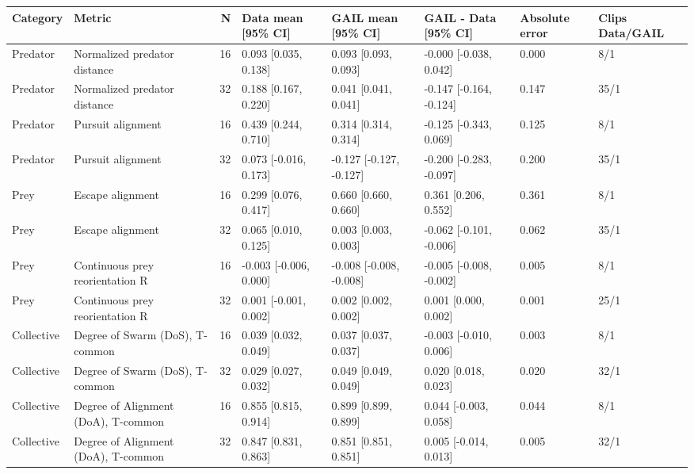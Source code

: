 \begin{tabular}{llrlllll}
\toprule
Category & Metric & N & Data mean [95\% CI] & GAIL mean [95\% CI] & GAIL - Data [95\% CI] & Absolute error & Clips Data/GAIL \\
\midrule
Predator & Normalized predator distance & 16 & 0.093 [0.035, 0.138] & 0.093 [0.093, 0.093] & -0.000 [-0.038, 0.042] & 0.000 & 8/1 \\
Predator & Normalized predator distance & 32 & 0.188 [0.167, 0.220] & 0.041 [0.041, 0.041] & -0.147 [-0.164, -0.124] & 0.147 & 35/1 \\
Predator & Pursuit alignment & 16 & 0.439 [0.244, 0.710] & 0.314 [0.314, 0.314] & -0.125 [-0.343, 0.069] & 0.125 & 8/1 \\
Predator & Pursuit alignment & 32 & 0.073 [-0.016, 0.173] & -0.127 [-0.127, -0.127] & -0.200 [-0.283, -0.097] & 0.200 & 35/1 \\
Prey & Escape alignment & 16 & 0.299 [0.076, 0.417] & 0.660 [0.660, 0.660] & 0.361 [0.206, 0.552] & 0.361 & 8/1 \\
Prey & Escape alignment & 32 & 0.065 [0.010, 0.125] & 0.003 [0.003, 0.003] & -0.062 [-0.101, -0.006] & 0.062 & 35/1 \\
Prey & Continuous prey reorientation R & 16 & -0.003 [-0.006, 0.000] & -0.008 [-0.008, -0.008] & -0.005 [-0.008, -0.002] & 0.005 & 8/1 \\
Prey & Continuous prey reorientation R & 32 & 0.001 [-0.001, 0.002] & 0.002 [0.002, 0.002] & 0.001 [0.000, 0.002] & 0.001 & 25/1 \\
Collective & Degree of Swarm (DoS), T-common & 16 & 0.039 [0.032, 0.049] & 0.037 [0.037, 0.037] & -0.003 [-0.010, 0.006] & 0.003 & 8/1 \\
Collective & Degree of Swarm (DoS), T-common & 32 & 0.029 [0.027, 0.032] & 0.049 [0.049, 0.049] & 0.020 [0.018, 0.023] & 0.020 & 32/1 \\
Collective & Degree of Alignment (DoA), T-common & 16 & 0.855 [0.815, 0.914] & 0.899 [0.899, 0.899] & 0.044 [-0.003, 0.058] & 0.044 & 8/1 \\
Collective & Degree of Alignment (DoA), T-common & 32 & 0.847 [0.831, 0.863] & 0.851 [0.851, 0.851] & 0.005 [-0.014, 0.013] & 0.005 & 32/1 \\
\bottomrule
\end{tabular}
